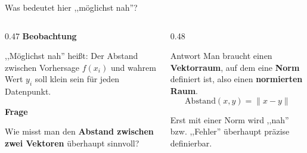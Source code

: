 \begin{frame}{Was bedeutet hier ,,möglichst nah''?}
\begin{columns}
\begin{column}{0.47\linewidth}
\textbf{Beobachtung}

,,Möglichst nah'' heißt: Der Abstand zwischen Vorhersage $f(x_i)$ und wahrem Wert $y_i$ soll klein sein für jeden Datenpunkt.

\vspace{0.3cm}
\textbf{Frage}

Wie misst man den \textbf{Abstand zwischen zwei Vektoren} überhaupt sinnvoll?
\end{column}
\begin{column}{0.48\linewidth}
\begin{block}{Antwort}
Man braucht einen \textbf{Vektorraum}, auf dem eine \textbf{Norm} definiert ist,  also einen \textbf{normierten Raum}.
\[
\text{Abstand}(x,y) = \|x - y\|
\]
\end{block}

\vspace{0.2cm}
Erst mit einer Norm wird ,,nah'' bzw. ,,Fehler'' überhaupt präzise definierbar.
\end{column}
\end{columns}
\end{frame}
